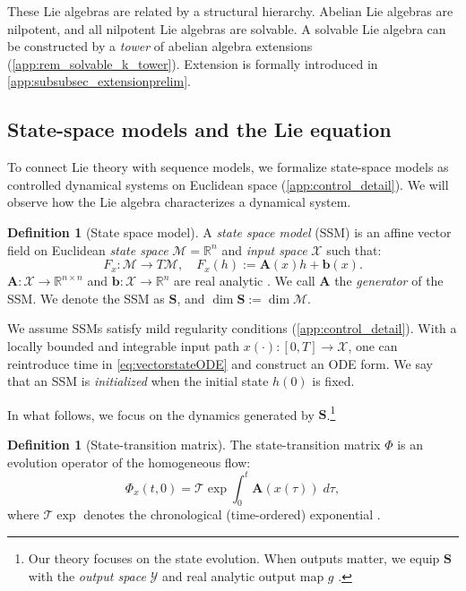 \documentclass{article}
\theoremstyle{plain}
\theoremstyle{definition}
\newtheorem{definition}[theorem]{Definition}
\theoremstyle{remark}
\newcommand{\mcal}[1]{\mathcal{#1}}
\newcommand{\mbf}[1]{\mathbf{#1}}
\newcommand{\bb}[1]{\mathbb{#1}}
\begin{document}
These Lie algebras are related by a structural hierarchy.
Abelian Lie algebras are nilpotent, and all nilpotent Lie algebras are solvable.
A solvable Lie algebra can be constructed by a
\emph{tower} of abelian algebra extensions (\cref{app:rem_solvable_k_tower}).
Extension is formally introduced in \cref{app:subsubsec_extensionprelim}.
\subsection{State-space models and the Lie equation}
\label{sec:LPVsystem}
To connect Lie theory with sequence models, we formalize state-space models
as controlled dynamical systems on Euclidean space (\cref{app:control_detail}).
We will observe how the Lie algebra characterizes a dynamical system.
\begin{definition}[State space model]
\label{def:staticLPVsystem}
A \emph{state space model} (SSM) is an affine vector field
on Euclidean \emph{state space} $\mcal{M} = \bb{R}^n$
and \emph{input space} $\mcal{X}$
such that:
\begin{equation}
\label{eq:vectorstateODE}
F_x: \mcal{M} \to T\mcal{M},
\quad F_x(h) := \mbf{A}(x) h + \mbf{b}(x).
\end{equation}
$\mbf{A}: \mcal{X} \to \bb{R}^{n \times n}$ and $\mbf{b}: \mcal{X} \to \bb{R}^n$ are real analytic \cite{sontag2013mathematical}.
We call $\mbf{A}$ the \emph{generator} of the SSM.
We denote the SSM as $\mbf{S}$, and $\dim \mbf{S} := \dim \mcal{M}$.
\end{definition}
We assume SSMs satisfy mild regularity conditions (\cref{app:control_detail}).
With a locally bounded and integrable input path $x(\cdot): [0,T] \to \mcal{X}$,
one can reintroduce time in \cref{eq:vectorstateODE} and construct an ODE form.
We say that an SSM is \emph{initialized} when the initial state $h(0)$ is fixed.

In what follows, we focus on the dynamics generated by $\mbf{S}$.\footnote{
Our theory focuses on the state evolution. When outputs matter, we equip $\mbf{S}$ with
the \emph{output space} $\mcal{Y}$ and real analytic output map $g$ \cite{sontag2013mathematical}.}
\begin{definition}[State-transition matrix]
\label{def:Phi}
    The state-transition matrix $\Phi$
    is an evolution operator of the homogeneous flow:
    \begin{equation}
        \label{eq:STM}
        \Phi_x(t,0) = \mcal{T} \exp \int_0^t \mathbf{A}(x(\tau)) \; d\tau,
    \end{equation}
    where $\mcal{T} \exp$ denotes the chronological (time-ordered) exponential \cite{agrachev2013control, sontag2013mathematical}.
\end{definition}
\end{document}
